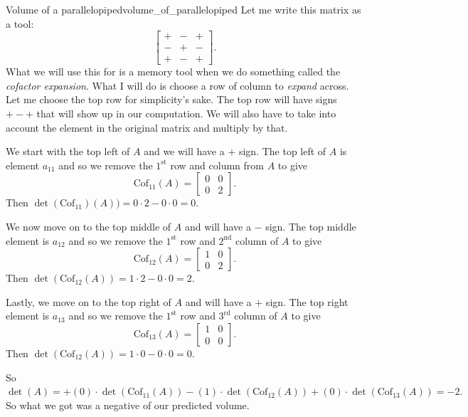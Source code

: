\begin{ex}{Volume of a parallelopiped}{volume_of_parallelopiped}
Let me write this matrix as a tool:
\[
\begin{bmatrix} + & - & +\\ - & + & - \\ + & - & + \end{bmatrix}.
\]
What we will use this for is a memory tool when we do something called the \emph{cofactor expansion}.  What I will do is choose a row of column to \emph{expand} across.  Let me choose the top row for simplicity's sake.  The top row will have signs $+-+$ that will show up in our computation. We will also have to take into account the element in the original matrix and multiply by that.

We start with the top left of $A$ and we will have a $+$ sign.  The top left of $A$ is element $a_{11}$ and so we remove the $1^{\textrm{st}}$ row and column from $A$ to give
\[
\textrm{Cof}_{11}(A)=\begin{bmatrix} 0 & 0 \\ 0 & 2 \end{bmatrix}.
\]
Then $\det(\textrm{Cof}_{11})(A))=0\cdot 2 - 0 \cdot 0=0.$

We now move on to the top middle of $A$ and will have a $-$ sign. The top middle element is $a_{12}$ and so we remove the $1^{\textrm{st}}$ row and $2^{\textrm{nd}}$ column of $A$ to give
\[
\textrm{Cof}_{12}(A)=\begin{bmatrix} 1 & 0 \\ 0 & 2\end{bmatrix}.
\]
Then $\det(\textrm{Cof}_{12}(A))=1\cdot 2-0 \cdot 0=2.$

Lastly, we move on to the top right of $A$ and will have a $+$ sign. The top right element is $a_{13}$ and so we remove the $1^{\textrm{st}}$ row and $3^{\textrm{rd}}$ column of $A$ to give
\[
\textrm{Cof}_{13}(A)=\begin{bmatrix} 1 & 0 \\ 0 & 0\end{bmatrix}.
\]
Then $\det(\textrm{Cof}_{12}(A))=1\cdot 0-0 \cdot 0=0.$

So $\det(A)=+(0)\cdot\det(\textrm{Cof}_{11}(A))-(1)\cdot\det(\textrm{Cof}_{12}(A))+(0)\cdot\det(\textrm{Cof}_{13}(A))=-2.$ So what we got was a negative of our predicted volume.
        \end{ex}

